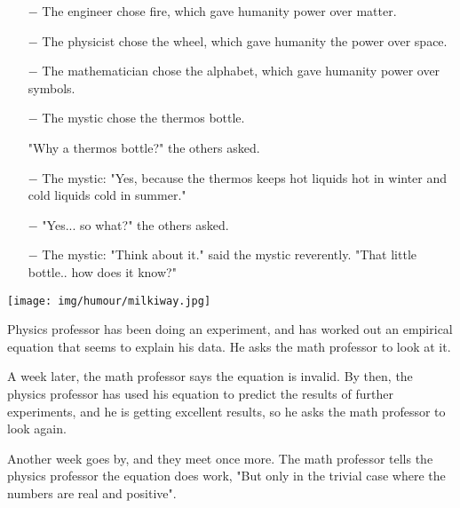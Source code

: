 \begin{itemize}	 
	\item[$-$] The engineer chose fire, which gave humanity power over matter.

	\item[$-$] The physicist chose the wheel, which gave humanity the power over space.

	\item[$-$] The mathematician chose the alphabet, which gave humanity power over symbols.

	\item[$-$] The mystic chose the thermos bottle.

"Why a thermos bottle?" the others asked.

	\item[$-$] The mystic: "Yes, because the thermos keeps hot liquids hot in winter and cold liquids cold in summer."

	\item[$-$] "Yes... so what?" the others asked.

	\item[$-$] The mystic: "Think about it." said the mystic reverently. "That little bottle.. how does it know?"
	\end{itemize}
\begin{center}\underline{\hspace{5 cm}}\end{center}

	\begin{center}
	\texttt{[image: img/humour/milkiway.jpg]}
	\end{center}
\begin{center}\underline{\hspace{5 cm}}\end{center}

Physics professor has been doing an experiment, and has worked out an empirical equation that seems to explain his data. He asks the math professor to look at it. 

A week later, the math professor says the equation is invalid. By then, the physics professor has used his equation to predict the results of further experiments, and he is getting excellent results, so he asks the math professor to look again. 

Another week goes by, and they meet once more. The math professor tells the physics professor the equation does work, "But only in the trivial case where the numbers are real and positive".
\begin{center}\underline{\hspace{5 cm}}\end{center}

